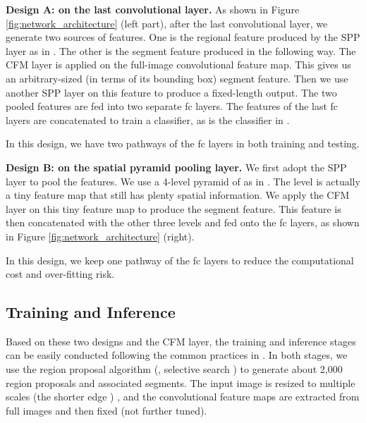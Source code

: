 \documentclass[10pt,twocolumn,letterpaper]{article}
\begin{document}
\vspace{6pt}
\noindent\textbf{Design A: on the last convolutional layer.} As shown in Figure \ref{fig:network_architecture} (left part), after the last convolutional layer, we generate two sources of features. One is the regional feature produced by the SPP layer as in \cite{he2014spatial}. The other is the segment feature produced in the following way. The CFM layer is applied on the full-image convolutional feature map. This gives us an arbitrary-sized (in terms of its bounding box) segment feature. Then we use another SPP layer on this feature to produce a fixed-length output. The two pooled features are fed into two separate fc layers. The features of the last fc layers are concatenated to train a classifier, as is the classifier in \cite{hariharan2014simultaneous}.

In this design, we have two pathways of the fc layers in both training and testing.

\vspace{6pt}
\noindent\textbf{Design B: on the spatial pyramid pooling layer.}
We first adopt the SPP layer \cite{he2014spatial} to pool the features. We use a 4-level pyramid of  as in \cite{he2014spatial}. The  level is actually a  tiny feature map that still has plenty spatial information. We apply the CFM layer on this tiny feature map to produce the segment feature. This feature is then concatenated with the other three levels and fed onto the fc layers, as shown in Figure \ref{fig:network_architecture} (right).

In this design, we keep one pathway of the fc layers to reduce the computational cost and over-fitting risk.

\subsection{Training and Inference}
\label{sec:training_and_inference}

Based on these two designs and the CFM layer, the training and inference stages can be easily conducted following the common practices in \cite{girshick2013rich,he2014spatial,hariharan2014simultaneous}. In both stages, we use the region proposal algorithm (\eg, selective search \cite{uijlings2013selective}) to generate about 2,000 region proposals and associated segments. The input image is resized to multiple scales (the shorter edge ) \cite{he2014spatial}, and the convolutional feature maps are extracted from full images and then fixed (not further tuned).
\end{document}
